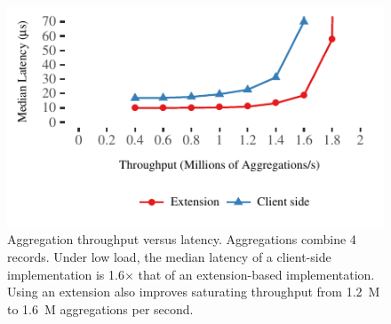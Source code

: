 \begin{figure}[t]
\centering
\includegraphics[width=1.0\columnwidth]{graphs/aggregate.pdf}
  \caption{Aggregation throughput versus latency. Aggregations
    combine 4 records. Under low
    load, the median latency of a client-side implementation is 1.6$\times$
    that of an extension-based implementation. Using an
    extension also improves saturating throughput from 1.2~M to 1.6~M
    aggregations per second.}
\label{fig:aggregate-bench}
\end{figure}
